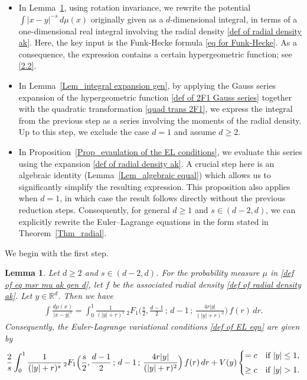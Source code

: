 \documentclass[10pt]{amsart}
\theoremstyle{plain}
\newtheorem{lem}[thm]{Lemma}
\theoremstyle{remark}
\numberwithin{equation}{section}
\begin{document}
\begin{itemize}
    \item In Lemma~\ref{Lem_angular integral gen}, using rotation invariance, we rewrite the potential 
    $
    \int |x-y|^{-s}\, d\mu(x)
    $
    originally given as a $d$-dimensional integral, in terms of a one-dimensional real integral involving the radial density \eqref{def of radial density ak}. Here, the key input is the Funk-Hecke formula \eqref{eq for Funk-Hecke}. As a consequence, the expression contains a certain hypergeometric function; see \eqref{2.2}. 
    \smallskip 
   \item In Lemma~\ref{Lem_integral expansion gen}, by applying the Gauss series expansion of the hypergeometric function \eqref{def of 2F1 Gauss series} together with the quadratic transformation \eqref{quad trans 2F1}, we express the integral from the previous step as a series involving the moments of the radial density. Up to this step, we exclude the case $d=1$ and assume $d \ge 2$. 
\smallskip 

\item In Proposition~\ref{Prop_evaulation of the EL conditions}, we evaluate this series using the expansion \eqref{def of radial density ak}. A crucial step here is an algebraic identity (Lemma~\ref{Lem_algebraic equal}) which allows us to significantly simplify the resulting expression. This proposition also applies when $d=1$, in which case the result follows directly without the previous reduction steps. Consequently, for general $d \ge 1$ and $s \in (d-2,d)$, we can explicitly rewrite the Euler--Lagrange equations in the form stated in Theorem~\ref{Thm_radial}.
\end{itemize}
We begin with the first step.  

\begin{lem}  \label{Lem_angular integral gen}
Let $d \ge 2$ and $s \in (d-2,d)$. For the probability measure $\mu$ in \eqref{def of eq msr mu ak gen d}, let $f$ be the associated radial density \eqref{def of radial density ak}. 
Let $y \in \mathbb{R}^{d}$. Then we have 
\begin{align} \label{2.2}
\int \frac{ d\mu(x) }{ |x-y|^s } =  \int_{ 0 }^1    \frac{1}{(|y|+r)^s}    \, {}_2F_1\Big(  \frac{s}{2}, \frac{d-1}{2} \, ; \, d-1 \, ; \,   \frac{4r|y|}{(|y|+r)^2} \Big)\, f(r) \,dr. 
\end{align}
Consequently, the Euler-Lagrange variational conditions \eqref{def of EL eqn} are given by 
\begin{equation}
\frac{2}{s} \int_{ 0 }^1    \frac{1}{(|y|+r)^s}    \, {}_2F_1\Big(  \frac{s}{2}, \frac{d-1}{2} \, ; \, d-1 \, ; \,   \frac{4r|y|}{(|y|+r)^2} \Big)\, f(r) \,dr +V(y)  \begin{cases}
= c & \textup{if } |y| \le 1,
\smallskip 
\\
\ge c & \textup{if } |y| > 1. 
\end{cases}
\end{equation}
\end{lem}
\end{document}
